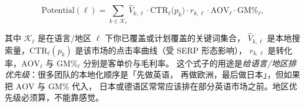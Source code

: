 \begin{equation}
\text{Potential}(\ell) = \sum_{k \in \mathcal{K}_{\ell}} \hat{V}_{k,\ell} \cdot \text{CTR}_{\ell}\big(p_{k}\big) \cdot r_{k,\ell} \cdot \text{AOV}_{\ell} \cdot \text{GM\%}_{\ell} ,
\label{eq:geopotential}
\end{equation}

其中 $\mathcal{K}_{\ell}$ 是在语言/地区 $\ell$ 下你已覆盖或计划覆盖的关键词集合，
$\hat{V}_{k,\ell}$ 是本地搜索量，$\text{CTR}_{\ell}(p_k)$ 是该市场的点击率曲线（受 SERP 形态影响），
$r_{k,\ell}$ 是转化率，$\text{AOV}_{\ell}$ 与 $\text{GM\%}_{\ell}$ 分别是客单价与毛利率。
这个式子的用途是\emph{给语言/地区排优先级}：很多团队的本地化顺序是「先做英语，
再做欧洲，最后做日本」，但如果把 $\text{AOV}$ 与 $\text{GM\%}$ 代入，
日本或德语区常常应该排在部分英语市场之前。地区优先级必须算，不能靠感觉。

